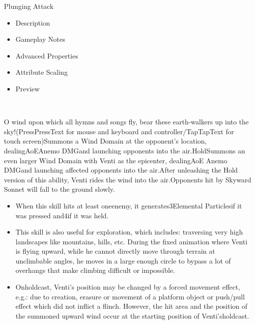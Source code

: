 \documentclass[a4paper,12pt]{article}
\begin{document}
Plunging Attack\\ \par \vspace{0.5cm}

\begin{itemize}
\item Description
\item Gameplay Notes
\item Advanced Properties
\item Attribute Scaling
\item Preview
\end{itemize}\\ \par \vspace{0.5cm}

O wind upon which all hymns and songs fly, bear these earth-walkers up into the sky!(PressPressText for mouse and keyboard and controller/TapTapText for touch screen)Summons a Wind Domain at the opponent's location, dealingAoEAnemo DMGand launching opponents into the air.HoldSummons an even larger Wind Domain with Venti as the epicenter, dealingAoE Anemo DMGand launching affected opponents into the air.After unleashing the Hold version of this ability, Venti rides the wind into the air.Opponents hit by Skyward Sonnet will fall to the ground slowly.\\ \par \vspace{0.5cm}

\begin{itemize}
\item When this skill hits at least oneenemy, it generates3Elemental Particlesif it was pressed and4if it was held.
\item This skill is also useful for exploration, which includes: traversing very high landscapes like mountains, hills, etc. During the fixed animation where Venti is flying upward, while he cannot directly move through terrain at unclimbable angles, he moves in a large enough circle to bypass a lot of overhangs that make climbing difficult or impossible.
\item Onholdcast, Venti's position may be changed by a forced movement effect, e.g.: due to creation, erasure or movement of a platform object or push/pull effect which did not inflict a flinch. However, the hit area and the position of the summoned upward wind occur at the starting position of Venti'sholdcast.
\end{itemize}\\ \par \vspace{0.5cm}
\end{document}
